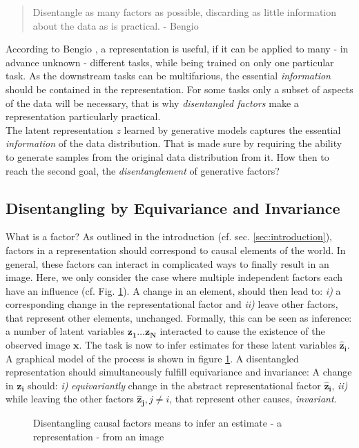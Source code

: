 	\begin{quote}
		{Disentangle as many factors as possible, discarding as little information about the data as is practical.} - Bengio \etal \cite{bengio13rep} %
	\end{quote}

	According to Bengio \etal \cite{bengio13rep},  a representation is useful, if it can be applied to many - in advance unknown - different tasks, while being trained on only one particular task.
	As the downstream tasks can be multifarious, the essential \textit{information} should be contained in the representation.
	For some tasks only a subset of aspects of the data will be necessary, that is why \textit{disentangled factors} make a representation particularly practical.\\
	The latent representation $z$ learned by generative models captures the essential \textit{information} of the data distribution. That is made sure by requiring the ability to generate samples from the original data distribution from it.
	How then to reach the second goal, the \textit{disentanglement} of generative factors?

	\subsection{Disentangling by Equivariance and Invariance}
		What is a factor? As outlined in the introduction (cf. sec. \ref{sec:introduction}), factors in a representation should correspond to causal elements of the world.
		In general, these factors can interact in complicated ways to finally result in an image. Here, we only consider the case where multiple independent factors each have an influence (cf. Fig. \ref{fig:infer}).
		A change in an element, should then lead to: \emph{i)} a corresponding change in the representational factor and \emph{ii)} leave other factors, that represent other elements, unchanged.
		Formally, this can be seen as inference: a number of latent variables $\mathbf{z_1}\ldots\mathbf{z_N}$ interacted to cause the existence of the observed image $\mathbf{x}$. The task is now to infer estimates for these latent variables $\mathbf{\hat z_i}$. A graphical model of the process is shown in figure \ref{fig:infer}.
		A disentangled representation should simultaneously fulfill equivariance and invariance: A change in $\mathbf{z_i}$ should: \emph{i)} \textit{equivariantly} change in the abstract representational factor $\mathbf{\hat z_i}$, \emph{ii)} while leaving the other factors $\mathbf{\hat z_j}, j\neq i$, that represent other causes, \textit{invariant}.
		\begin{figure}[ht]
			\centering
			
			\caption{Disentangling causal factors means to infer an estimate - \ie a representation - from an image}
			\label{fig:infer}
		\end{figure}


